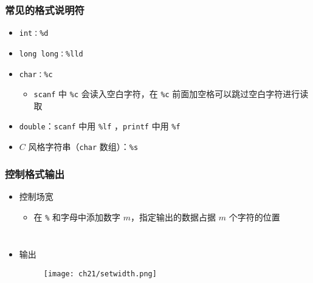 \begin{frame}[fragile]
    \frametitle{常见的格式说明符}

    \begin{itemize}
       \item \lstinline|int：%d|
       \item \lstinline|long long：%lld|
       \item \lstinline|char：%c|
        \begin{itemize}
           \item \lstinline|scanf| 中 \lstinline|%c| 会读入空白字符，在 \lstinline|%c| 前面加空格可以跳过空白字符进行读取
        \end{itemize}
       \item \lstinline|double|：\lstinline|scanf| 中用 \lstinline|%lf| ，\lstinline|printf| 中用 \lstinline|%f|
       \item $C$ 风格字符串（\lstinline|char| 数组）：\lstinline|%s|
    \end{itemize}
    
\end{frame}

\begin{frame}[fragile]
    \frametitle{控制格式输出}

    \begin{itemize}
       \item 控制场宽
        \begin{itemize}
           \item 在 \lstinline|%| 和字母中添加数字 $m$，指定输出的数据占据 $m$ 个字符的位置
        \end{itemize}
    \end{itemize}

   \begin{columns}

        

        \begin{itemize}
           \item 输出
            \begin{figure}
                \texttt{[image: ch21/setwidth.png]}
            \end{figure}
            
        \end{itemize}
   \end{columns}
    
\end{frame}

